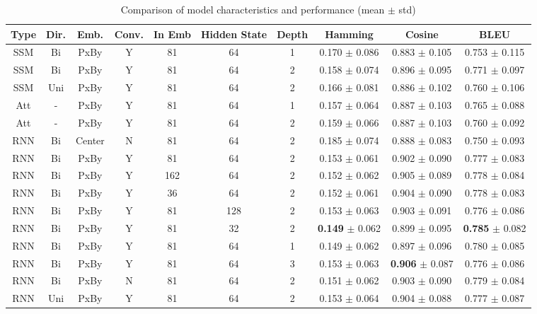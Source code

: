 \documentclass[10pt,a4paper]{article}
\begin{document}
\begin{table}[h]
\centering
\small
\begin{tabular}{cccccccccc}
\hline
Type & Dir. & Emb. & Conv. & In Emb & Hidden State & Depth & Hamming & Cosine & BLEU \\
\hline
SSM & Bi & PxBy & Y & 81 & 64 & 1 & 0.170 $\pm$ 0.086 & 0.883 $\pm$ 0.105 & 0.753 $\pm$ 0.115 \\
SSM & Bi & PxBy & Y & 81 & 64 & 2 & 0.158 $\pm$ 0.074 & 0.896 $\pm$ 0.095 & 0.771 $\pm$ 0.097 \\
SSM & Uni & PxBy & Y & 81 & 64 & 2 & 0.166 $\pm$ 0.081 & 0.886 $\pm$ 0.102 & 0.760 $\pm$ 0.106 \\
Att & - & PxBy & Y & 81 & 64 & 1 & 0.157 $\pm$ 0.064 & 0.887 $\pm$ 0.103 & 0.765 $\pm$ 0.088 \\
Att & - & PxBy & Y & 81 & 64 & 2 & 0.159 $\pm$ 0.066 & 0.887 $\pm$ 0.103 & 0.760 $\pm$ 0.092 \\
RNN & Bi & Center & N & 81 & 64 & 2 & 0.185 $\pm$ 0.074 & 0.888 $\pm$ 0.083 & 0.750 $\pm$ 0.093 \\
RNN & Bi & PxBy & Y & 81 & 64 & 2 & 0.153 $\pm$ 0.061 & 0.902 $\pm$ 0.090 & 0.777 $\pm$ 0.083 \\
RNN & Bi & PxBy & Y & 162 & 64 & 2 & 0.152 $\pm$ 0.062 & 0.905 $\pm$ 0.089 & 0.778 $\pm$ 0.084 \\
RNN & Bi & PxBy & Y & 36 & 64 & 2 & 0.152 $\pm$ 0.061 & 0.904 $\pm$ 0.090 & 0.778 $\pm$ 0.083 \\
RNN & Bi & PxBy & Y & 81 & 128 & 2 & 0.153 $\pm$ 0.063 & 0.903 $\pm$ 0.091 & 0.776 $\pm$ 0.086 \\
RNN & Bi & PxBy & Y & 81 & 32 & 2 & \textbf{0.149} $\pm$ 0.062 & 0.899 $\pm$ 0.095 & \textbf{0.785} $\pm$ 0.082 \\
RNN & Bi & PxBy & Y & 81 & 64 & 1 & 0.149 $\pm$ 0.062 & 0.897 $\pm$ 0.096 & 0.780 $\pm$ 0.085 \\
RNN & Bi & PxBy & Y & 81 & 64 & 3 & 0.153 $\pm$ 0.063 & \textbf{0.906} $\pm$ 0.087 & 0.776 $\pm$ 0.086 \\
RNN & Bi & PxBy & N & 81 & 64 & 2 & 0.151 $\pm$ 0.062 & 0.903 $\pm$ 0.090 & 0.779 $\pm$ 0.084 \\
RNN & Uni & PxBy & Y & 81 & 64 & 2 & 0.153 $\pm$ 0.064 & 0.904 $\pm$ 0.088 & 0.777 $\pm$ 0.087 \\
\hline
\end{tabular}
\caption{Comparison of model characteristics and performance (mean $\pm$ std)}
\label{tab:model_comparison}
\end{table}
\end{document}
